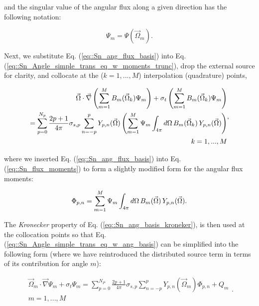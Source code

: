 \noindent and the singular value of the angular flux along a given direction has the following notation:

\begin{equation}
\label{eq::Sn_ang_flux_identity}
\Psi_m = \Psi (\vec{\Omega}_m).
\end{equation}

Next, we substitute Eq. (\ref{eq::Sn_ang_flux_basis}) into Eq. (\ref{eq::Sn_Angle_simple_trans_eq_w_moments_trunc}), drop the external source for clarity, and collocate at the ($k=1,...,M$) interpolation (quadrature) points,

\begin{equation}
\label{eq::Sn_Angle_simple_trans_eq_w_ang_basis}
\begin{aligned}
\vec{\Omega} \cdot \vec{\nabla} \left( \sum\displaylimits_{m=1}^{M} B_m (\vec{\Omega}_k)  \Psi_m \right) + \sigma_t \left(  \sum\displaylimits_{m=1}^{M} B_m (\vec{\Omega}_k)  \Psi_m \right) \\
= \sum_{p=0}^{N_p} \frac{2p + 1}{4 \pi} \sigma_{s,p}   \sum_{n=-p}^{p}   Y_{p,n} (  \vec{\Omega} ) \left(  \sum\displaylimits_{m=1}^M \Psi_m \int_{4 \pi} d\Omega \, B_m (\vec{\Omega}_k)  \, Y_{p,n} (\vec{\Omega})  \right)  \\
k=1,...,M
\end{aligned} ,
\end{equation}

\noindent where we inserted Eq. (\ref{eq::Sn_ang_flux_basis}) into Eq. (\ref{eq::Sn_flux_moments}) to form a slightly modified form for the angular flux moments:

\begin{equation}
\label{eq::Sn_flux_mom_int_w_basis}
\Phi_{p,n} = \sum\displaylimits_{m=1}^M \Psi_m \int_{4 \pi} d\Omega \, B_m (\vec{\Omega})  \, Y_{p,n} (\vec{\Omega}).
\end{equation}

\noindent The {\em Kronecker} property of Eq. (\ref{eq::Sn_ang_basis_kroneker}), is then used at the collocation points so that Eq. (\ref{eq::Sn_Angle_simple_trans_eq_w_ang_basis}) can be simplified into the following form (where we have reintroduced the distributed source term in terms of its contribution for angle $m$):

\begin{equation}
\label{eq::Sn_trans_eq_angle_disc_FINAL}
\begin{aligned}
\vec{\Omega}_m \cdot \vec{\nabla} \Psi_{m}  + \sigma_{t}   \Psi_{m}=  \sum_{p=0}^{N_P} \frac{2p + 1}{4 \pi}  \sigma_{s,p}  \sum_{n=-p}^{p}  Y_{p,n} (  \vec{\Omega}_m )  \Phi_{p,n}  + Q_{m}  \\
m=1,...,M
\end{aligned} .
\end{equation}

